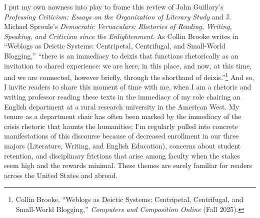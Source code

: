 \documentclass{tufte-handout}
\begin{document}
I put my own nowness into play to frame this review of John Guillory's
\emph{Professing Criticism: Essays on the Organization of Literary
Study} and J. Michael Sproule's \emph{Democratic Vernaculars: Rhetorics
of Reading, Writing, Speaking, and Criticism since the Enlightenment}.
As Collin Brooke writes in ``Weblogs as Deictic Systems: Centripetal,
Centrifugal, and Small-World Blogging,'' ``there is an immediacy to
deixis that functions rhetorically as an invitation to shared
experience: we are here, in this place, and now, at this time, and we
are connected, however briefly, through the shorthand of
deixis.''\footnote{Collin Brooke, ``Weblogs as Deictic Systems:
  Centripetal, Centrifugal, and Small-World Blogging,'' \emph{Computers
  and Composition Online} (Fall 2025).} And so, I invite readers to
share this moment of time with me, when I am a rhetoric and writing
professor reading these texts in the immediacy of my role chairing an
English department at a rural research university in the American West.
My tenure as a department chair has often been marked by the immediacy
of the crisis rhetoric that haunts the humanities; I'm regularly pulled
into concrete manifestations of this discourse because of decreased
enrollment in our three majors (Literature, Writing, and English
Education), concerns about student retention, and disciplinary frictions
that arise among faculty when the stakes seem high and the rewards
minimal. These themes are surely familiar for readers across the United
States and abroad.
\end{document}
